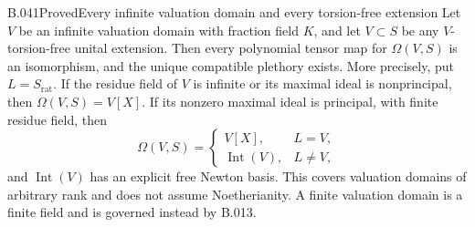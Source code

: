 \begin{saresult}{B.041}{Proved}{Every infinite valuation domain and every torsion-free extension}
Let $V$ be an infinite valuation domain with fraction field $K$,
and let $V\subset S$ be any $V$-torsion-free unital extension.
Then every polynomial tensor map for $\Omega(V,S)$ is an
isomorphism, and the unique compatible plethory exists.
More precisely, put $L=S_{\mathrm{rat}}$. If the residue field
of $V$ is infinite or its maximal ideal is nonprincipal, then
$\Omega(V,S)=V[X]$. If its nonzero maximal ideal is principal,
with finite residue field, then
\[
 \Omega(V,S)=
 \begin{cases}
 V[X],&L=V,\\
 \operatorname{Int}(V),&L\ne V,
 \end{cases}
\]
and $\operatorname{Int}(V)$ has an explicit free Newton basis.
This covers valuation domains of arbitrary rank and does not
assume Noetherianity. A finite valuation domain is a finite field
and is governed instead by B.013.
\end{saresult}
